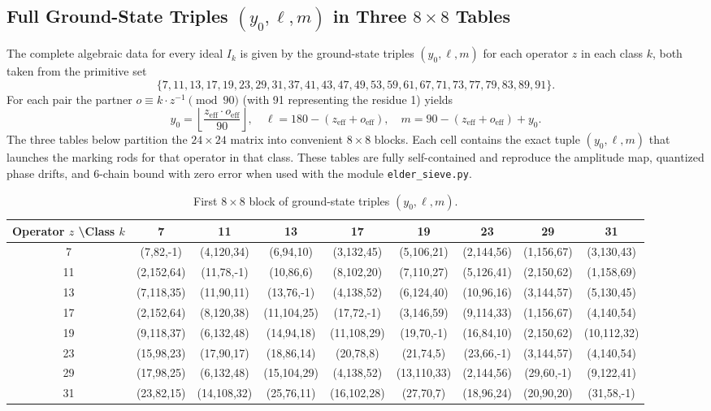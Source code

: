 \documentclass[11pt,a4paper]{article}
\begin{document}
\subsection{Full Ground-State Triples \((y_0, \ell, m)\) in Three \(8 \times 8\) Tables}

The complete algebraic data for every ideal \(I_k\) is given by the ground-state triples \((y_0, \ell, m)\) for each operator \(z\) in each class \(k\), both taken from the primitive set
\[
\{7,11,13,17,19,23,29,31,37,41,43,47,49,53,59,61,67,71,73,77,79,83,89,91\}.
\]
For each pair the partner \(o \equiv k \cdot z^{-1} \pmod{90}\) (with 91 representing the residue 1) yields
\[
y_0 = \left\lfloor \frac{z_{\mathrm{eff}} \cdot o_{\mathrm{eff}}}{90} \right\rfloor, \quad
\ell = 180 - (z_{\mathrm{eff}} + o_{\mathrm{eff}}), \quad
m = 90 - (z_{\mathrm{eff}} + o_{\mathrm{eff}}) + y_0.
\]
The three tables below partition the \(24 \times 24\) matrix into convenient \(8 \times 8\) blocks. Each cell contains the exact tuple \((y_0, \ell, m)\) that launches the marking rods for that operator in that class. These tables are fully self-contained and reproduce the amplitude map, quantized phase drifts, and 6-chain bound with zero error when used with the module \texttt{elder\_sieve.py}.

\begin{table}[htbp]
\centering
\tiny
\begin{tabular}{c|cccccccc}
Operator \(z\) \textbackslash Class \(k\) & 7 & 11 & 13 & 17 & 19 & 23 & 29 & 31 \\
\hline
7  & (7,82,-1) & (4,120,34) & (6,94,10) & (3,132,45) & (5,106,21) & (2,144,56) & (1,156,67) & (3,130,43) \\
11 & (2,152,64) & (11,78,-1) & (10,86,6) & (8,102,20) & (7,110,27) & (5,126,41) & (2,150,62) & (1,158,69) \\
13 & (7,118,35) & (11,90,11) & (13,76,-1) & (4,138,52) & (6,124,40) & (10,96,16) & (3,144,57) & (5,130,45) \\
17 & (2,152,64) & (8,120,38) & (11,104,25) & (17,72,-1) & (3,146,59) & (9,114,33) & (1,156,67) & (4,140,54) \\
19 & (9,118,37) & (6,132,48) & (14,94,18) & (11,108,29) & (19,70,-1) & (16,84,10) & (2,150,62) & (10,112,32) \\
23 & (15,98,23) & (17,90,17) & (18,86,14) & (20,78,8) & (21,74,5) & (23,66,-1) & (3,144,57) & (4,140,54) \\
29 & (17,98,25) & (6,132,48) & (15,104,29) & (4,138,52) & (13,110,33) & (2,144,56) & (29,60,-1) & (9,122,41) \\
31 & (23,82,15) & (14,108,32) & (25,76,11) & (16,102,28) & (27,70,7) & (18,96,24) & (20,90,20) & (31,58,-1) \\
\end{tabular}
\caption{First \(8 \times 8\) block of ground-state triples \((y_0, \ell, m)\).}
\label{tab:ym-block1}
\end{table}
\end{document}
